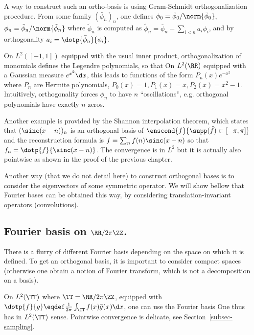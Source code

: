 A way to construct such an ortho-basis is using Gram-Schmidt orthogonalization procedure. From some family $(\bar\phi_n)_n$, one defines $\phi_0=\bar\phi_0/\norm{\bar\phi_0}$, $\phi_n=\tilde\phi_n/\norm{\tilde\phi_n}$ where $\tilde\phi_n$ is computed as  $\tilde\phi_n=\bar\phi_n - \sum_{i<n} a_i \phi_i$, and by orthogonality $a_i = \dotp{\bar \phi_n}{\phi_i}$. 

On $L^2([-1,1])$ equipped with the usual inner product, orthogonalization of monomials defines the Legendre polynomials, so that
On $L^2(\RR)$ equipped with a Gaussian measure $e^{x^2}\d x$, this leads to functions of the form $P_n(x) e^{-x^2}$ where $P_n$ are Hermite polynomials, $P_0(x)=1, P_1(x)=x, P_2(x)=x^2-1$. Intuitively, orthogonality forces $\phi_n$ to have $n$ ``oscillations'', e.g. orthogonal polynomials have exactly $n$ zeros.

Another example is provided by the Shannon interpolation theorem, which states that $( \sinc(x-n) )_n$ is an orthogonal basis of $\enscond{f}{\supp(\hat f) \subset [-\pi,\pi]}$ and the reconstruction formula is $f=\sum_n f(n) \sinc(x-n)$ so that $f_n = \dotp{f}{\sinc(x-n)}$. The convergence is in $L^2$ but it is actually also pointwise as shown in the proof of the previous chapter. 


Another way (that we do not detail here) to construct orthogonal bases is to consider the eigenvectors of some symmetric operator. We will show bellow that Fourier bases can be obtained this way, by considering translation-invariant operators (convolutions). 


\subsection{Fourier basis on $\RR/2\pi\ZZ$.}

There is a flurry of different Fourier basis depending on the space on which it is defined. To get an orthogonal basis, it is important to consider compact spaces (otherwise one obtain a notion of Fourier transform, which is not a decomposition on a basis). 

On $L^2(\TT)$ where $\TT=\RR/2\pi\ZZ$, equipped with $\dotp{f}{g} \eqdef \frac{1}{2\pi}\int_\TT f(x) \bar g(x) \d x$, one can use the Fourier basis 
One thus has
in $L^2(\TT)$ sense. Pointwise convergence is delicate, see Section~\ref{subsec-sampling}.


